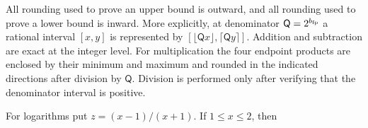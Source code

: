 All rounding used to prove an upper bound is outward, and all rounding
used to prove a lower bound is inward.  More explicitly, at denominator
$\mathsf Q=2^{b_{\rm fp}}$ a rational interval $[x,y]$ is represented by
$[\lfloor \mathsf Q x\rfloor,\lceil \mathsf Q y\rceil]$.  Addition and subtraction
are exact at the integer level.  For multiplication the four endpoint
products are enclosed by their minimum and maximum and rounded in the
indicated directions after division by $\mathsf Q$.  Division is performed
only after verifying that the denominator interval is positive.

For logarithms put $z=(x-1)/(x+1)$.  If $1\le x\le2$, then
